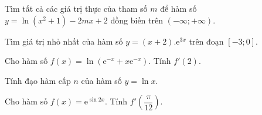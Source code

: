 \begin{bt}%
Tìm tất cả các giá trị thực của tham số $m$ để hàm số $y=\ln(x^2+1)-2mx+2$ đồng biến trên $(-\infty;+\infty)$.
\end{bt}
\begin{bt}%
Tìm giá trị nhỏ nhất của hàm số $y=(x+2).\mathrm{e}^{3x}$ trên đoạn $[-3;0]$.
\end{bt}
\begin{bt}%
Cho hàm số $f\left( x \right)=\ln \left( {\mathrm{e}^{-x}}+x{\mathrm{e}^{-x}} \right).$ Tính ${f}'\left( 2 \right).$ 
\end{bt}
\begin{bt}%
Tính đạo hàm cấp $n$ của hàm số $y=\ln x$.
\end{bt}
\begin{bt}
Cho hàm số $f(x)=\mathrm{e}^{\sin 2x}.$ Tính $f'\left(\dfrac{\pi}{12}\right).$
\end{bt}

